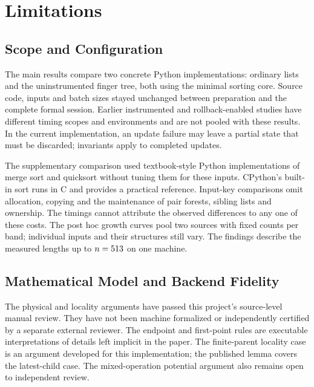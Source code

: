\chapter{Limitations}
\label{chap:limitations}

\section{Scope and Configuration}
\label{sec:limitations-scope}
\label{sec:limitations-version}

The main results compare two concrete Python implementations: ordinary lists and
the uninstrumented finger tree, both using the minimal sorting core. Source
code, inputs and batch sizes stayed unchanged between preparation and the
complete formal session. Earlier instrumented and rollback-enabled studies
have different timing scopes and environments and are not pooled with these
results. In the current implementation, an update failure may leave a partial
state that must be discarded; invariants apply to completed updates.

The supplementary comparison used textbook-style Python implementations of
merge sort and quicksort without tuning them for these inputs. CPython's
built-in sort runs in C and provides a practical reference. Input-key
comparisons omit allocation, copying and the maintenance of pair forests,
sibling lists and ownership. The timings cannot attribute the observed
differences to any one of these costs. The post hoc growth curves pool two
sources with fixed counts per band; individual inputs and their structures
still vary. The findings describe the measured lengths up to
$n=513{}$ on one machine.

\section{Mathematical Model and Backend Fidelity}
\label{sec:limitations-backend}

The physical and locality arguments have passed this project's source-level
manual review. They have not been machine formalized or independently certified
by a separate external reviewer. The endpoint and first-point rules are
executable interpretations of details left implicit in the paper. The
finite-parent locality case is an argument developed for this implementation;
the published lemma covers the latest-child case. The mixed-operation
potential argument also remains open to independent review.

